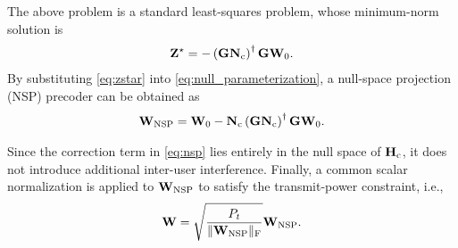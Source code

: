 \documentclass[conference]{IEEEtran}
\begin{document}
The above problem is a standard least-squares problem, whose minimum-norm solution is
\begin{align}
\mathbf{Z}^{\star}
=
-
\left(
\mathbf{G}\mathbf{N}_{\rm c}
\right)^{\dagger}
\mathbf{G}\mathbf{W}_{0}.
\label{eq:zstar}
\end{align}
By substituting \eqref{eq:zstar} into \eqref{eq:null_parameterization}, a null-space projection (NSP) precoder can be obtained as
\begin{align}
\mathbf{W}_{\rm NSP}
=
\mathbf{W}_{0}
-
\mathbf{N}_{\rm c}
\left(
\mathbf{G}\mathbf{N}_{\rm c}
\right)^{\dagger}
\mathbf{G}\mathbf{W}_{0}.
\label{eq:nsp}
\end{align}

Since the correction term in \eqref{eq:nsp} lies entirely in the null space of $\mathbf{H}_{\rm c}$, it does not introduce additional inter-user interference. Finally, a common scalar normalization is applied to $\mathbf{W}_{\rm NSP}$ to satisfy the transmit-power constraint, i.e.,
\begin{align}
    \mathbf{W}  = \sqrt{\frac{P_t}{\|\mathbf{W}_{\rm NSP}\|_\mathrm{F}}} \mathbf{W}_{\rm NSP}.
\end{align}

\end{document}
